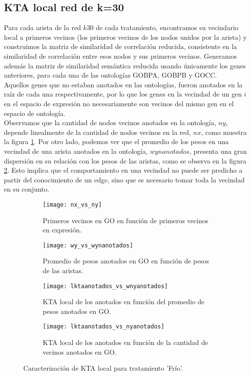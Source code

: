 \subsection{KTA local red de k=30}
Para cada arista de la red $k30$ de cada tratamiento, encontramos su vecindario local a primeros vecinos (los primeros vecinos de los nodos unidos por la arista) y construimos la matriz de similaridad de correlación reducida, consistente en la similaridad de correlación entre esos nodos y sus primeros vecinos. Generamos además la matriz de similaridad semántica reducida usando únicamente los genes anteriores, para cada una de las ontologías GOBPA, GOBPB y GOCC.\\
Aquellos genes que no estaban anotados en las ontologías, fueron anotados en la raíz de cada una respectivamente, por lo que los genes en la vecindad de un gen $i$ en el espacio de expresión no necesariamente son vecinos del mismo gen en el espacio de ontología.\\
Observamos que la cantidad de nodos vecinos anotados en la ontología, $ny$, depende linealmente de la cantidad de nodos vecinos en la red, $nx$, como muestra la figura \ref{fig:nx_vs_ny}. Por otro lado, podemos ver que el promedio de los pesos en una vecindad de una arista anotados en la ontología, $wynanotados$, presenta una gran dispersión en su relación con los pesos de las aristas, como se observa en la figura \ref{fig:wy_vs_wynanotados}. Esto implica que el comportamiento en una vecindad no puede ser predicho a partir del conocimiento de un edge, sino que es necesario tomar toda la vecindad en su conjunto.
\begin{figure}[t!]
    \centering
    \begin{subfigure}[t]{0.45\textwidth}
    \centering
    \texttt{[image: nx\_vs\_ny]}
    \caption{Primeros vecinos en GO en función de primeros vecinos en expresión.}
    \label{fig:nx_vs_ny}
    \end{subfigure}    
    \begin{subfigure}[t]{0.45\textwidth}
    \centering
    \texttt{[image: wy\_vs\_wynanotados]}
    \caption{Promedio de pesos anotados en GO en función de pesos de las aristas.}
    \label{fig:wy_vs_wynanotados}
    \end{subfigure}    
    \begin{subfigure}[t]{0.45\textwidth}
    \centering
    \texttt{[image: lktaanotados\_vs\_wnyanotados]}
    \caption{KTA local de los anotados en función del promedio de pesos anotados en GO.}
    \label{fig:lktaanotados_vs_wnyanotados}
    \end{subfigure}    
    \begin{subfigure}[t]{0.45\textwidth}
    \centering
    \texttt{[image: lktaanotados\_vs\_nyanotados]}
    \caption{KTA local de los anotados en función de la cantidad de vecinos anotados en GO.}
    \label{fig:lktaanotados_vs_nyanotados}
    \end{subfigure}            
    \label{fig:ktalocal}
    \caption{Caracterización de KTA local para tratamiento 'Frío'.}
\end{figure}
